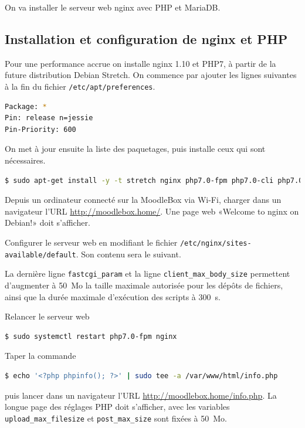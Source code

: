 \documentclass[11pt]{article}
\begin{document}
On va installer le serveur web nginx avec PHP et MariaDB.

\subsection{Installation et configuration de nginx et PHP}

Pour une performance accrue on installe nginx 1.10 et PHP7, à partir de la future distribution Debian Stretch. On commence par ajouter les lignes suivantes à la fin du fichier \lstinline{/etc/apt/preferences}.
\begin{lstlisting}[language=bash]
Package: *
Pin: release n=jessie
Pin-Priority: 600
\end{lstlisting}

On met à jour ensuite la liste des paquetages, puis installe ceux qui sont nécessaires.

\begin{lstlisting}[language=bash]
$ sudo apt-get install -y -t stretch nginx php7.0-fpm php7.0-cli php7.0-xmlrpc php7.0-curl php7.0-gd php7.0-intl php7.0-soap php7.0-mysql php-apcu
\end{lstlisting}

\begin{verification}
Depuis un ordinateur connecté sur la MoodleBox via Wi-Fi, charger dans un navigateur l'URL \url{http://moodlebox.home/}. Une page web «Welcome to nginx on Debian!» doit s'afficher.
\end{verification}

Configurer le serveur web en modifiant le fichier \lstinline{/etc/nginx/sites-available/default}.
Son contenu sera le suivant.



La dernière ligne \lstinline{fastcgi_param} et la ligne \lstinline{client_max_body_size} permettent d'augmenter à 50~Mo la taille maximale autorisée pour les dépôts de fichiers, ainsi que la durée maximale d'exécution des scripts à 300~s.

Relancer le serveur web
\begin{lstlisting}[language=bash]
$ sudo systemctl restart php7.0-fpm nginx
\end{lstlisting}

\begin{verification}
Taper la commande
\begin{lstlisting}[language=bash]
$ echo '<?php phpinfo(); ?>' | sudo tee -a /var/www/html/info.php
\end{lstlisting}
puis lancer dans un navigateur l'URL \url{http://moodlebox.home/info.php}. La longue page des réglages PHP doit s'afficher, avec les variables \lstinline{upload_max_filesize} et \lstinline{post_max_size} sont fixées à 50~Mo.
\end{verification}
\end{document}
